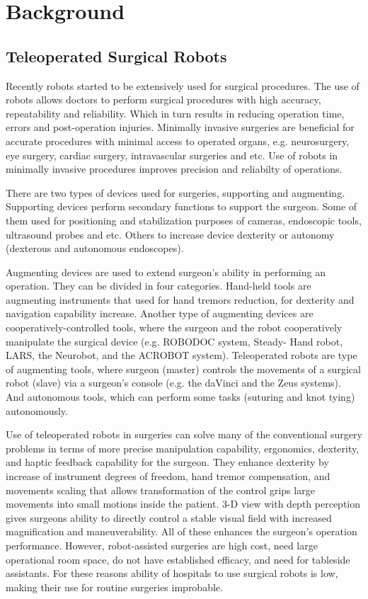 \chapter{Background}
\label{back}

\section{Teleoperated Surgical Robots}
\label{sec:daVinci}
Recently robots started to be extensively used for surgical procedures. The use of robots allows doctors to perform surgical procedures with high accuracy, repeatability and reliability. Which in turn results in reducing operation time, errors and post-operation injuries. Minimally invasive surgeries are beneficial for accurate procedures with minimal access to operated organs, e.g. neurosurgery, eye surgery, cardiac surgery, intravascular surgeries and etc.  Use of robots in minimally invasive procedures improves precision and reliabilty of operations. \cite{tavakoli_haptics_2008}

There are two types of devices used for surgeries, supporting and augmenting. 
Supporting devices perform secondary functions to support the surgeon.  Some of them used for positioning and stabilization purposes of cameras, endoscopic tools, ultrasound probes and etc. Others to increase device dexterity or autonomy (dexterous and autonomous endoscopes).

Augmenting devices are used to extend surgeon's ability in performing an operation. They can be divided in four categories. Hand-held tools are augmenting instruments that used for hand tremors reduction, for dexterity and navigation capability increase. Another type of augmenting devices are cooperatively-controlled tools, where the surgeon and the robot cooperatively manipulate the surgical device (e.g. ROBODOC system, Steady- Hand robot, LARS, the Neurobot, and the ACROBOT system). Teleoperated robots are type of augmenting tools, where surgeon (master) controls the movements of a surgical robot (slave) via a surgeon's console (e.g. the daVinci and the Zeus systems). And autonomous tools, which can perform some tasks (suturing and knot tying) autonomously. \cite{tavakoli_haptics_2008}

Use of teleoperated robots in surgeries can solve many of the conventional surgery problems in terms of more precise manipulation capability, ergonomics, dexterity, and haptic feedback capability for the surgeon. They enhance dexterity by increase of instrument degrees of freedom, hand tremor compensation, and movements scaling that allows transformation of the control grips large movements into small motions inside the patient. 3-D view with depth perception gives surgeons ability to directly control a stable visual field with increased magnification and maneuverability. All of these enhances the surgeon's operation performance. However, robot-assisted surgeries are high cost, need large operational room space, do not have established efficacy, and need for tableside assistants. For these reasons ability of hospitals to use surgical robots is low, making their use for routine surgeries improbable. \cite{tavakoli_haptics_2008}

